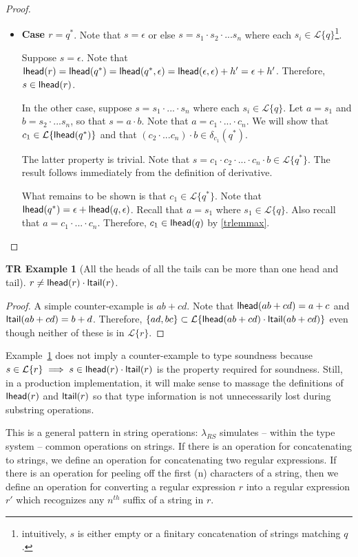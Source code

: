 \documentclass[12pt]{article}
\newtheorem{trexam}[tr]{TR Example}
\theoremstyle{definition}
\newcommand{\Lagr}{\mathcal{L}}
\newcommand{\lang}[1]{\Lagr\{#1\}}
\newcommand{\lambdas}{\lambda_{RS}}
\newcommand{\lhead}[1]{ {\sf lhead}(#1) }
\newcommand{\ltail}[1]{ {\sf ltail}(#1) }
\begin{document}
\begin{proof}
\begin{itemize}[label=$ $,itemsep=1ex]
\item \textbf{Case $r = q^*$}.
Note that $s = \epsilon$ or else $s = s_1 \cdot s_2 \cdot ... s_n$ where each $s_i \in \lang{q}$\footnote{intuitively, $s$ is either empty or a finitary concatenation of strings matching $q$.}.

Suppose $s = \epsilon$.
Note that $\lhead{r} = \lhead{q^*} = \lhead{q^*, \epsilon} = \lhead{\epsilon, \epsilon} + h' = \epsilon + h'$.
Therefore, $s \in \lhead{r}$.

In the other case, suppose $s = s_1 \cdot ... \cdot s_n$ where each $s_i \in \lang{q}$.
Let $a = s_1$ and $b = s_2 \cdot ... s_n$, so that $s = a \cdot b$.
Note that $a = c_1 \cdot ... \cdot c_n$.
We will show that $c_1 \in \lang{\lhead{q^*}}$ and that $(c_2 \cdot ... c_n) \cdot b \in \delta_{c_1}(q^*)$.

The latter property is trivial. Note that $s = c_1 \cdot c_2 \cdot ... \cdot c_n \cdot b \in \lang{q^*}$.
The result follows immediately from the definition of derivative.

What remains to be shown is that $c_1 \in \lang{q^*}$.
Note that $\lhead{q^*} = \epsilon + \lhead{q, \epsilon}$.
Recall that $a = s_1$ where $s_1 \in \lang{q}$.
Also recall that $a= c_1 \cdot ... \cdot c_n$.
Therefore, $c_1 \in \lhead{q}$ by \ref{trlemmax}.

\end{itemize}
\end{proof}

\begin{trexam}[All the heads of all the tails can be more than one head and tail]\label{exam:headsandtails}
$r \not = \lhead{r} \cdot \ltail{r}$.
\end{trexam}
\begin{proof}
A simple counter-example is $ab + cd$. 
Note that $\lhead{ab + cd} = a+c$ and $\ltail{ab + cd} = b + d$. 
Therefore, $\{ad,bc\} \subset \lang{\lhead{ab + cd} \cdot \ltail{ab + cd}}$ even though neither of these is in $\lang{r}$.
\end{proof}

Example~\ref{exam:headsandtails} does not imply a counter-example to type soundness because $s \in \lang{r} \implies s \in \lhead{r}\cdot\ltail{r}$ is the
property required for soundness. Still, in a production implementation, it will make sense to massage the definitions of $\lhead{r}$ and $\ltail{r}$ so that type information is not unnecessarily lost during substring operations.

This is a general pattern in string operations: $\lambdas$ simulates -- within the type system -- common operations on strings. 
If there is an operation for concatenating to strings, we define an operation for concatenating two regular expressions.
If there is an operation for peeling off the first (n) characters of a string, then we define an operation for 
converting a regular expression $r$ into a regular expression $r'$ which recognizes any $n^{th}$ suffix of a string in $r$.
\end{document}
